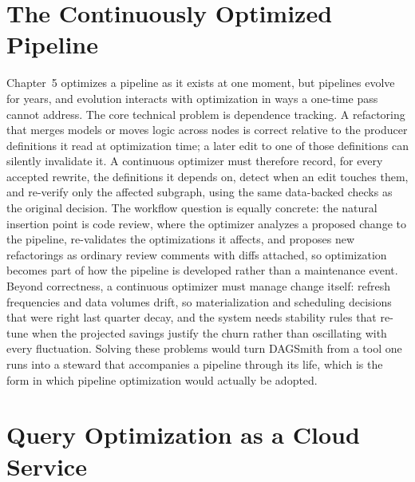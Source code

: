 \section{The Continuously Optimized Pipeline}
\label{sec:fw:pipelines}

Chapter~5 optimizes a pipeline as it exists at one moment, but
pipelines evolve for years, and evolution interacts with
optimization in ways a one-time pass cannot address. The core
technical problem is dependence tracking. A refactoring that merges
models or moves logic across nodes is correct relative to the
producer definitions it read at optimization time; a later edit to
one of those definitions can silently invalidate it. A continuous
optimizer must therefore record, for every accepted rewrite, the
definitions it depends on, detect when an edit touches them, and
re-verify only the affected subgraph, using the same data-backed
checks as the original decision. The workflow question is equally
concrete: the natural insertion point is code review, where the
optimizer analyzes a proposed change to the pipeline, re-validates
the optimizations it affects, and proposes new refactorings as
ordinary review comments with diffs attached, so optimization
becomes part of how the pipeline is developed rather than a
maintenance event. Beyond correctness, a continuous optimizer must
manage change itself: refresh frequencies and data volumes drift, so
materialization and scheduling decisions that were right last
quarter decay, and the system needs stability rules that re-tune
when the projected savings justify the churn rather than
oscillating with every fluctuation. Solving these problems would
turn DAGSmith from a tool one runs into a steward that accompanies
a pipeline through its life, which is the form in which pipeline
optimization would actually be adopted.

\section{Query Optimization as a Cloud Service}
\label{sec:fw:service}

